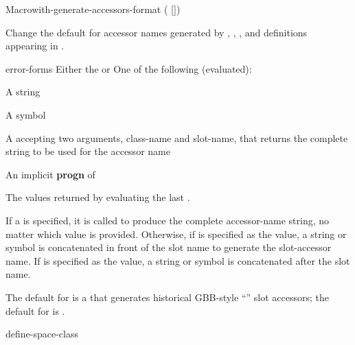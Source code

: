 \documentclass[10pt,twoside,english,pdftex]{article}
\begin{document}
\begin{functiondoc}{Macro}{with-generate-accessors-format}%
  {( [])
    \superstar{}
    \returns{} \superstar{}}

\fnsyntax

\fnpurpose Change the default for accessor names generated by
\textbf{}, \textbf{},
\textbf{}, and
\textbf{} definitions appearing in .

\fnpackage {}

\fnmodule {}

\fnargs
\begin{args}{error-forms}
\arg[format] Either the   or 
 One of the following (evaluated):
\begin{tightitemize}
\item A string 
\item A symbol
\item A  accepting two arguments, class-name and
  slot-name, that returns the complete string to be used for the accessor name
\end{tightitemize}
\arg[forms] An implicit \textbf{progn} of 
\end{args}

\fnreturns The values returned by evaluating the last .

\fndescription If a   is
specified, it is called to produce the complete accessor-name string, no
matter which  value is provided.  Otherwise, if 
is specified as the  value, a string or symbol
 is concatenated in front of the slot name to
generate the slot-accessor name.  If  is specified as the
 value, a string or symbol  is
concatenated after the slot name.

The default  for  is a
 that generates historical GBB-style
``'' slot accessors; the default for
 is .

\begin{alsos}{define-space-class}
\end{alsos}


\end{functiondoc}
\end{document}
